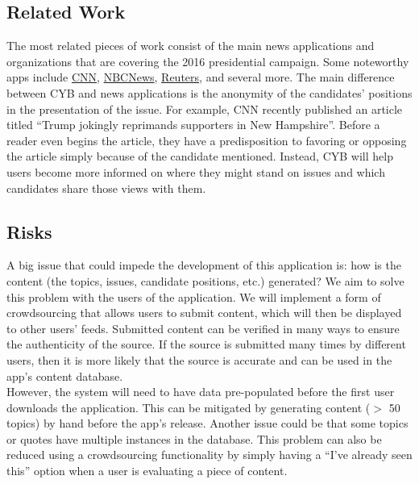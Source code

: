 \documentclass{article}
\begin{document}
\subsection{Related Work}

The most related pieces of work consist of the main news applications and organizations that are covering the 2016 presidential campaign. Some noteworthy apps include \href{http://www.cnn.com/politics}{CNN}, \href{http://www.nbcnews.com/politics/2016-election}{NBCNews}, \href{http://live.reuters.com/Event/Election_2016?Page=64}{Reuters}, and several more. The main difference between CYB and news applications is the anonymity of the candidates' positions in the presentation of the issue. For example, CNN recently published an article titled ``Trump jokingly reprimands supporters in New Hampshire''. Before a reader even begins the article, they have a predisposition to favoring or opposing the article simply because of the candidate mentioned. Instead, CYB will help users become more informed on where they might stand on issues and which candidates share those views with them. 
\vspace{-5px}
\subsection{Risks}

A big issue that could impede the development of this application is: how is the content (the topics, issues, candidate positions, etc.) generated? We aim to solve this problem with the users of the application. We will implement a form of crowdsourcing that allows users to submit content, which will then be displayed to other users' feeds. Submitted content can be verified in many ways to ensure the authenticity of the source. If the source is submitted many times by different users, then it is more likely that the source is accurate and can be used in the app's content database.\\

However, the system will need to have data pre-populated before the first user downloads the application. This can be mitigated by generating content ($>$ 50 topics) by hand before the app's release. Another issue could be that some topics or quotes have multiple instances in the database. This problem can also be reduced using a crowdsourcing functionality by simply having a ``I've already seen this'' option when a user is evaluating a piece of content. 
\end{document}
